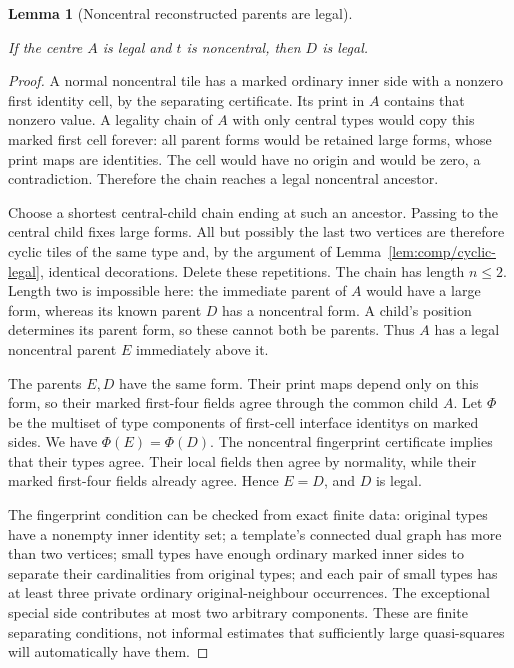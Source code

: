\documentclass[11pt,a4paper]{article}
\newtheorem{lemma}[definition]{Lemma}
\theoremstyle{remark}
\newcommand{\lean}[1]{}
\newcommand{\uses}[1]{}
\begin{document}
\begin{lemma}[Noncentral reconstructed parents are legal]
\label{lem:comp/noncentral-legal}
\lean{Tilings.Planned.reconstructed_noncentral_legal,Tilings.Planned.Strict.strict_reconstructed_noncentral_legal}
\uses{lem:comp/exact,lem:comp/cyclic-legal,def:certificate,def:control/legal}
If the centre $A$ is legal and $t$ is noncentral, then $D$ is legal.
\end{lemma}
\begin{proof}
A normal noncentral tile has a marked ordinary inner side with a nonzero
first identity cell, by the separating certificate. Its print in $A$
contains that nonzero value. A legality chain of $A$ with only central
types would copy this marked first cell forever: all parent forms would
be retained large forms, whose print maps are identities. The cell would
have no origin and would be zero, a contradiction. Therefore the chain
reaches a legal noncentral ancestor.

Choose a shortest central-child chain ending at such an ancestor. Passing
to the central child fixes large forms. All but possibly the last two
vertices are therefore cyclic tiles of the same type and, by the argument
of Lemma~\ref{lem:comp/cyclic-legal}, identical decorations. Delete these
repetitions. The chain has length $n\le2$. Length two is impossible here:
the immediate parent of $A$ would have a large form, whereas its known
parent $D$ has a noncentral form. A child's position determines its parent
form, so these cannot both be parents. Thus $A$ has a legal noncentral
parent $E$ immediately above it.

The parents $E,D$ have the same form. Their print maps depend only on this
form, so their marked first-four fields agree through the common child $A$.
Let $\Phi$ be the multiset of type components of first-cell interface identitys
on marked sides. We have $\Phi(E)=\Phi(D)$. The noncentral fingerprint
certificate implies that their types agree. Their local fields then agree
by normality, while their marked first-four fields already agree. Hence
$E=D$, and $D$ is legal.

The fingerprint condition can be checked from exact finite data: original
types have a nonempty inner identity set; a template's connected dual graph
has more than two vertices; small types have enough ordinary marked inner
sides to separate their cardinalities from original types; and each pair
of small types has at least three private ordinary original-neighbour
occurrences. The exceptional special side contributes at most two arbitrary
components. These are finite separating conditions, not informal estimates
that sufficiently large quasi-squares will automatically have them.
\end{proof}
\end{document}
